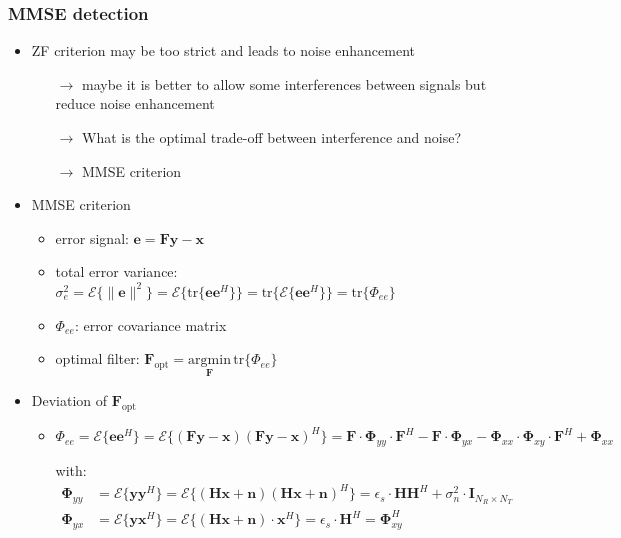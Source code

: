 \documentclass[a4paper, 10pt]{article}
\begin{document}
\subsubsection{MMSE detection}
\begin{itemize}
\item ZF criterion may be too strict and leads to noise enhancement
	\begin{itemize}
		\item[$\rightarrow$] maybe it is better to allow some interferences between signals but reduce noise enhancement
		\item[$\rightarrow$] What is the optimal trade-off between interference and noise?
		\item[$\rightarrow$] MMSE criterion
	\end{itemize}
\item MMSE criterion 
	\begin{itemize}
		\item error signal: $ \mathbf{e} = \mathbf{Fy} - \mathbf{x} $
		\item total error variance: $\sigma_e^2 = \mathcal{E}\bigl \{ \| \mathbf{e}\| ^2\bigr\} = \mathcal{E}\bigl \{\text{tr}\{\mathbf{ee}^H\} \bigr\} = \text{tr}\bigl\{\mathcal{E}\{\mathbf{ee}^H\}\bigr\} = \text{tr}\{ \Phi_{ee}\}$ 
		\item $\Phi_{ee}$: error covariance matrix
		\item optimal filter: $\mathbf{F}_{\text{opt}} = \underset{\mathbf{F}}{\mathrm{argmin}}\,\mathrm{tr}\{\Phi_{ee}\} $
	\end{itemize}
	\item Deviation of $\mathbf{F}_{\text{opt}}$
	\begin{itemize}
		\item $\Phi_{ee}= \mathcal{E}\{\mathbf{ee}^H\} = \mathcal{E}\{(\mathbf{Fy} - \mathbf{x})(\mathbf{Fy} - \mathbf{x})^H \} = \mathbf{F}\cdot\boldsymbol{\Phi}_{yy}\cdot\mathbf{F}^H - \mathbf{F}\cdot\boldsymbol{\Phi}_{yx} - \boldsymbol{\Phi}_{xx}\cdot\boldsymbol{\Phi}_{xy}\cdot\mathbf{F}^H + \boldsymbol{\Phi}_{xx} $
		\item[] with:
		\begin{align*}
			\boldsymbol{\Phi}_{yy} &= \mathcal{E}\{ \mathbf{yy}^H\} = \mathcal{E}\{(\mathbf{Hx} + \mathbf{n})(\mathbf{Hx} + \mathbf{n})^H\} = \epsilon_s \cdot\mathbf{H}\mathbf{H}^H + \sigma_n^2\cdot\mathbf{I}_{N_R\times N_T}\\
			\boldsymbol{\Phi}_{yx} &= \mathcal{E}\{ \mathbf{yx}^H\} = \mathcal{E}\{ (\mathbf{Hx} + \mathbf{n})\cdot\mathbf{x}^H\} = \epsilon_s\cdot\mathbf{H}^H = \boldsymbol{\Phi}_{xy}^H\\

\end{align*}
\end{itemize}
\end{itemize}
\end{document}
